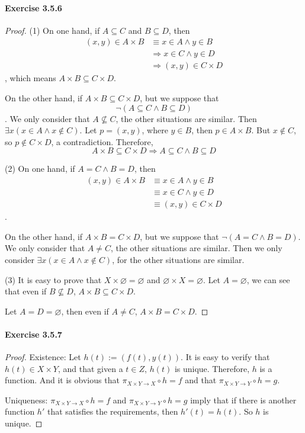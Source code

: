\paragraph{Exercise 3.5.6} \label{exercise3.5.6}
\begin{proof}
(1) On one hand, if $A \subseteq C$ and $B \subseteq D$, then 
\begin{align*}
(x,y) \in A \times B &\equiv x \in A \wedge y \in B \\
&\Longrightarrow x \in C \wedge y \in D \\
&\Longrightarrow (x,y) \in C \times D
\end{align*}, 
which means $A \times B \subseteq C \times D$.

On the other hand, if $A \times B \subseteq C \times D$, but we suppose that 
\[
\neg(A \subseteq C \wedge B \subseteq D)
\]. 
We only consider that $A \nsubseteq C$, the other situations are similar. Then 
$\exists x(x \in A \wedge x \notin C)$. Let $p = (x,y)$, where $y \in B$, then $p \in A \times B$. 
But $x \notin C$, so $p \notin C \times D$, a contradiction. Therefore, 
\[
A \times B \subseteq C \times D \Longrightarrow A \subseteq C \wedge B \subseteq D
\]

(2) On one hand, if $A = C \wedge B = D$, then
\begin{align*}
(x,y) \in A \times B &\equiv x \in A \wedge y \in B \\
&\equiv x \in C \wedge y \in D \\
&\equiv (x,y) \in C \times D
\end{align*}.

On the other hand, if $A \times B = C \times D$, but we suppose that $\neg(A = C \wedge B = D)$. 
We only consider that $A \neq C$, the other situations are similar. Then we only consider 
$\exists x(x \in A \wedge x \notin C)$, for the other situations are similar. 

(3) It is easy to prove that $X \times \varnothing = \varnothing$ and 
$\varnothing \times X = \varnothing$. Let $A = \varnothing$, we can see that even if $B \nsubseteq D$, 
$A \times B \subseteq C \times D$. 

Let $A = D = \varnothing$, then even if $A \neq C$, $A \times B = C \times D$.
\end{proof}

\paragraph{Exercise 3.5.7} \label{exercise3.5.7}
\begin{proof}
Existence: Let $h(t):=(f(t),y(t))$. It is easy to verify that $h(t) \in X \times Y$, and that given a 
$t \in Z$, $h(t)$ is unique. Therefore, $h$ is a function. And it is obvious that 
$\pi_{X\times Y \rightarrow X} \circ h = f$ and that $\pi_{X\times Y \rightarrow Y} \circ h = g$.

Uniqueness: $\pi_{X\times Y \rightarrow X} \circ h = f$ and $\pi_{X\times Y \rightarrow Y} \circ h = g$ 
imply that if there is another function $h'$ that satisfies the requirements, then $h'(t) = h(t)$. So $h$ 
is unique. 
\end{proof}

